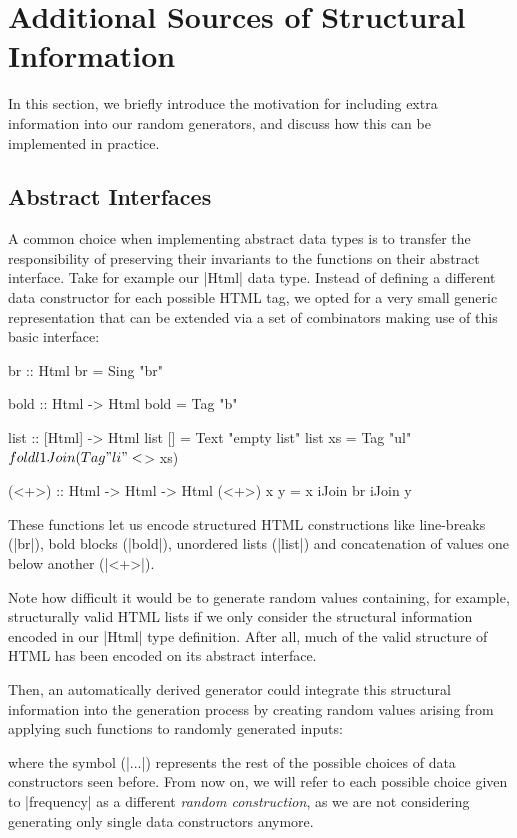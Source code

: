 \section{Additional Sources of Structural Information}
\label{sec:sources}

In this section, we briefly introduce the motivation for including extra
information into our random generators, and discuss how this can be implemented
in practice.


%
\subsection{Abstract Interfaces}

A common choice when implementing abstract data types is to transfer the
responsibility of preserving their invariants to the functions on their abstract
interface.
%
Take for example our |Html| data type.
%
Instead of defining a different data constructor for each possible HTML tag, we
opted for a very small generic representation that can be extended via a set of
combinators making use of this basic interface:

\begin{code}
br :: Html
br = Sing "br"

bold :: Html -> Html
bold = Tag "b"

list :: [Html] -> Html
list []  = Text "empty list"
list xs  = Tag "ul" $ foldl1 Join (Tag "li" <$> xs)

(<+>) :: Html -> Html -> Html
(<+>) x y = x iJoin br iJoin y
\end{code} %
%
These functions let us encode structured HTML constructions like line-breaks
(|br|), bold blocks (|bold|), unordered lists (|list|) and concatenation of
values one below another (|<+>|).
%

Note how difficult it would be to generate random values containing, for
example, structurally valid HTML lists if we only consider the structural
information encoded in our |Html| type definition.
%
After all, much of the valid structure of HTML has been encoded on its abstract
interface.


Then, an automatically derived generator could integrate this structural
information into the generation process by creating random values arising from
applying such functions to randomly generated inputs:

%
where the symbol (|...|) represents the rest of the possible choices of data
constructors seen before.
%
From now on, we will refer to each possible choice given to |frequency| as a
different \emph{random construction}, as we are not considering generating only
single data constructors anymore.


